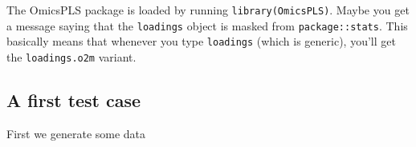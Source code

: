 \documentclass[]{article}
\newenvironment{Shaded}{\begin{snugshade}}{\end{snugshade}}
\newcommand{\KeywordTok}[1]{\textcolor[rgb]{0.13,0.29,0.53}{\textbf{{#1}}}}
\newcommand{\DataTypeTok}[1]{\textcolor[rgb]{0.13,0.29,0.53}{{#1}}}
\newcommand{\DecValTok}[1]{\textcolor[rgb]{0.00,0.00,0.81}{{#1}}}
\newcommand{\StringTok}[1]{\textcolor[rgb]{0.31,0.60,0.02}{{#1}}}
\newcommand{\CommentTok}[1]{\textcolor[rgb]{0.56,0.35,0.01}{\textit{{#1}}}}
\newcommand{\NormalTok}[1]{{#1}}
\begin{document}
The OmicsPLS package is loaded by running \texttt{library(OmicsPLS)}.
Maybe you get a message saying that the \texttt{loadings} object is
masked from \texttt{package::stats}. This basically means that whenever
you type \texttt{loadings} (which is generic), you'll get the
\texttt{loadings.o2m} variant.

\subsection{A first test case}\label{a-first-test-case}

First we generate some data

\begin{Shaded}
\end{Shaded}
\end{document}

